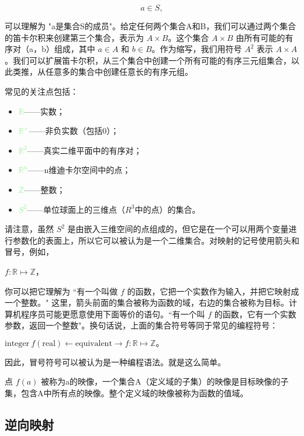 \documentclass[lang=cn,10pt]{elegantbook}
\begin{document}
$$a \in S,$$ 

可以理解为 "a是集合S的成员"。给定任何两个集合A和B，我们可以通过两个集合的笛卡尔积来创建第三个集合，表示为 $A \times B$。这个集合 $A \times B$ 由所有可能的有序对（a，b）组成，其中 $a \in A$ 和 $b \in B$。作为缩写，我们用符号 $A^2$ 表示 $A \times A$。我们可以扩展笛卡尔积，从三个集合中创建一个所有可能的有序三元组集合，以此类推，从任意多的集合中创建任意长的有序元组。

常见的关注点包括：

\begin{itemize}
  \item \textcolor{lightgreen}{$\mathbb{R}$}——实数；
  \item \textcolor{lightgreen}{$\mathbb{R^+}$}——非负实数（包括0）；
  \item \textcolor{lightgreen}{$\mathbb{R}^2$}——真实二维平面中的有序对；
  \item \textcolor{lightgreen}{$\mathbb{R}^n$}——n维迪卡尔空间中的点；
  \item \textcolor{lightgreen}{$\mathbb{Z}$}——整数；
  \item \textcolor{lightgreen}{$S^2$}——单位球面上的三维点（$R^3$中的点）的集合。
\end{itemize}

请注意，虽然 $S^2$ 是由嵌入三维空间的点组成的，但它是在一个可以用两个变量进行参数化的表面上，所以它可以被认为是一个二维集合。对映射的记号使用箭头和冒号，例如，
\begin{center}
  $f : \mathbb{R} \mapsto \mathbb{Z}$，
\end{center}

你可以把它理解为 ``有一个叫做 $f$ 的函数，它把一个实数作为输入，并把它映射成一个整数。" 这里，箭头前面的集合被称为函数的域，右边的集合被称为目标。计算机程序员可能更愿意使用下面等价的语句。``有一个叫 $f$ 的函数，它有一个实数参数，返回一个整数"。换句话说，上面的集合符号等同于常见的编程符号：

\begin{center}
  $\text{integer} \  f(\text{real}) \leftarrow \text{equivalent} \rightarrow f : \mathbb{R} \mapsto \mathbb{Z}。$
\end{center}

因此，冒号符号可以被认为是一种编程语法。就是这么简单。

点 $f(a)$ 被称为a的映像，一个集合A（定义域的子集）的映像是目标映像的子集，包含A中所有点的映像。整个定义域的映像被称为函数的值域。

\subsection{逆向映射}
\end{document}
